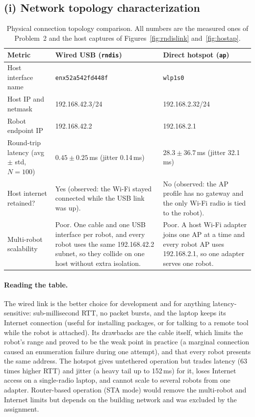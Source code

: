 \documentclass[11pt,a4paper]{article}
\begin{document}
\subsection{(i) Network topology characterization}
\begin{table}[H]\centering\small\raggedright
\begin{tabular}{@{}p{3.2cm}p{5.6cm}p{5.6cm}@{}}
\toprule
\textbf{Metric} & \textbf{Wired USB (\texttt{rndis})} & \textbf{Direct hotspot (\texttt{ap})}\\
\midrule
Host interface name & \texttt{enx52a542fd448f} & \texttt{wlp1s0}\\
Host IP and netmask & 192.168.42.3/24 & 192.168.2.32/24\\
Robot endpoint IP & 192.168.42.2 & 192.168.2.1\\
Round-trip latency (avg $\pm$ std, $N=100$) & $0.45\pm0.25$\,ms (jitter 0.14\,ms) & $28.3\pm36.7$\,ms (jitter 32.1\,ms)\\
Host internet retained? & Yes (observed: the Wi-Fi stayed connected while the USB link was up). & No (observed: the AP profile has no gateway and the only Wi-Fi radio is tied to the robot).\\
Multi-robot scalability & Poor. One cable and one USB interface per robot, and every robot uses the same 192.168.42.2 subnet, so they collide on one host without extra isolation. & Poor. A host Wi-Fi adapter joins one AP at a time and every robot AP uses 192.168.2.1, so one adapter serves one robot.\\
\bottomrule
\end{tabular}
\caption{Physical connection topology comparison. All numbers are the measured ones of Problem~2 and the host captures of Figures~\ref{fig:rndislink} and~\ref{fig:hostap}.}
\end{table}
\paragraph{Reading the table.} The wired link is the better choice for development and for anything latency-sensitive: sub-millisecond RTT, no packet bursts, and the laptop keeps its Internet connection (useful for installing packages, or for talking to a remote tool while the robot is attached). Its drawbacks are the cable itself, which limits the robot's range and proved to be the weak point in practice (a marginal connection caused an enumeration failure during one attempt), and that every robot presents the same address. The hotspot gives untethered operation but trades latency (63 times higher RTT) and jitter (a heavy tail up to 152\,ms) for it, loses Internet access on a single-radio laptop, and cannot scale to several robots from one adapter. Router-based operation (STA mode) would remove the multi-robot and Internet limits but depends on the building network and was excluded by the assignment.
\end{document}
